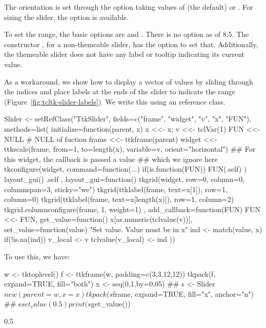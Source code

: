 The orientation is set through the option 
taking values of  (the default) or
. For sizing the slider, the 
option is available.  

To set the range, the basic options are  and
. There is no  option as of \TK\/
8.5. The constructor , for a non-themeable slider,
has the option  to set that. Additionally,
the themeable slider does not have any label or tooltip indicating its
current value.


As a workaround, we show how to display a vector of values by sliding
through the indices and place labels at the ends of the slider to
indicate the range (Figure~\ref{fig:tcltk-slider-labels}). We write
this using an \R{} reference class.

\begin{Schunk}
\begin{Sinput}
 Slider <-
   setRefClass("TtkSlider",
      fields=c("frame", "widget", "v", "x", "FUN"),
      methods=list(
        initialize=function(parent, x) {
          x <<- x;  v <<- tclVar(1)
          FUN <<- NULL                   # NULL of fuction
          frame <<- ttkframe(parent)
          widget <<- ttkscale(frame, from=1, to=length(x),
                              variable=v, orient="horizontal")
          ## For this widget, the callback is passed a value 
          ## which we ignore here
          tkconfigure(widget, command=function(...) {
            if(is.function(FUN)) FUN(.self)
          })
          layout_gui()
          .self
        },
        layout_gui=function() {         
          tkgrid(widget, row=0, column=0, columnspan=3, 
                 sticky="we")
          tkgrid(ttklabel(frame, text=x[1]), 
                 row=1, column=0)
          tkgrid(ttklabel(frame, text=x[length(x)]), 
                 row=1, column=2)
          tkgrid.columnconfigure(frame, 1, weight=1)
        },
        add_callback=function(FUN) FUN <<- FUN,
        get_value=function() x[as.numeric(tclvalue(v))],
        set_value=function(value) {
          "Set value. Value must be in x"
          ind <- match(value, x)
          if(!is.na(ind)) {
            v_local <- v
            tclvalue(v_local) <- ind
          }
        }
        ))
\end{Sinput}
\end{Schunk}

To use this, we have:
\begin{Schunk}
\begin{Sinput}
 w <- tktoplevel()
 f <- ttkframe(w, padding=c(3,3,12,12))
 tkpack(f, expand=TRUE, fill="both")
 x <- seq(0,1,by=0.05)
 ##
 s <- Slider$new(parent=w, x=x)
 tkpack(s$frame, expand=TRUE, fill="x", anchor="n")
 ##
 s$set_value(0.5)
 print(s$get_value())
\end{Sinput}
\begin{Soutput}
[1] 0.5
\end{Soutput}
\end{Schunk}

